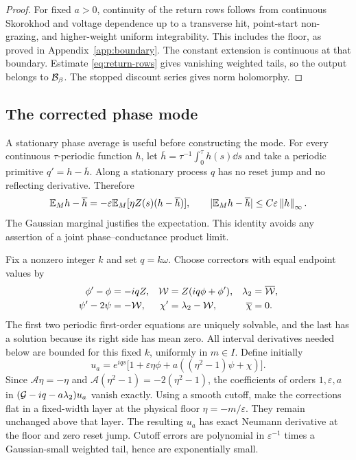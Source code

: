 \begin{proof}
For fixed $a>0$, continuity of the return rows follows from continuous
Skorokhod and voltage dependence up to a transverse hit, point-start
non-grazing, and higher-weight uniform integrability. This includes
the floor, as proved in Appendix~\ref{app:boundary}. The constant extension
is continuous at that boundary. Estimate \eqref{eq:return-rows} gives vanishing weighted
tails, so the output belongs to $\mathcal B_\beta$. The stopped discount
series gives norm holomorphy.
\end{proof}

\subsection{The corrected phase mode}

A stationary phase average is useful before constructing the mode.
For every continuous $\tau$-periodic function $h$, let
$\overline h=\tau^{-1}\int_0^\tau h(s)\dd s$ and take a periodic
primitive $q'=h-\overline h$. Along a stationary process $q$ has no
reset jump and no reflecting derivative. Therefore
\begin{equation}\label{eq:phase-average}
 \mathbb E_M h-\overline h
   =-\varepsilon\mathbb E_M[\eta Z(s)(h-\overline h)],\qquad
 |\mathbb E_M h-\overline h|\le C\varepsilon\left\|h\right\|_\infty.
\end{equation}
The Gaussian marginal justifies the expectation. This identity avoids
any assertion of a joint phase--conductance product limit.

Fix a nonzero integer $k$ and set $q=k\omega$. Choose correctors with
equal endpoint values by
\begin{align}\label{eq:correctors}
 \phi'-\phi&=-iqZ,&
 \mathcal W&=Z(iq\phi+\phi'),&
 \lambda_2&=\overline{\mathcal W},\notag\\
 \psi'-2\psi&=-\mathcal W,&
 \chi'&=\lambda_2-\mathcal W,& \overline\chi&=0.
\end{align}
The first two periodic first-order equations are uniquely solvable,
and the last has a solution because its right side has mean zero.
All interval derivatives needed below are bounded for this fixed $k$,
uniformly in $m\in I$. Define initially
\begin{equation}\label{eq:base-mode}
 u_a=e^{iqs}\bigl[1+\varepsilon\eta\phi+
                  a((\eta^2-1)\psi+\chi)\bigr].
\end{equation}
Since $\mathcal A\eta=-\eta$ and
$\mathcal A(\eta^2-1)=-2(\eta^2-1)$, the coefficients of orders
$1,\varepsilon,a$ in $(\mathcal G-iq-a\lambda_2)u_a$ vanish exactly.
Using a smooth cutoff, make the corrections flat in a fixed-width layer at the physical
floor $\eta=-m/\varepsilon$. They remain unchanged above that layer.
The resulting $u_a$ has exact Neumann derivative at the floor and zero
reset jump. Cutoff errors are polynomial in $\varepsilon^{-1}$ times
a Gaussian-small weighted tail, hence are exponentially small.

